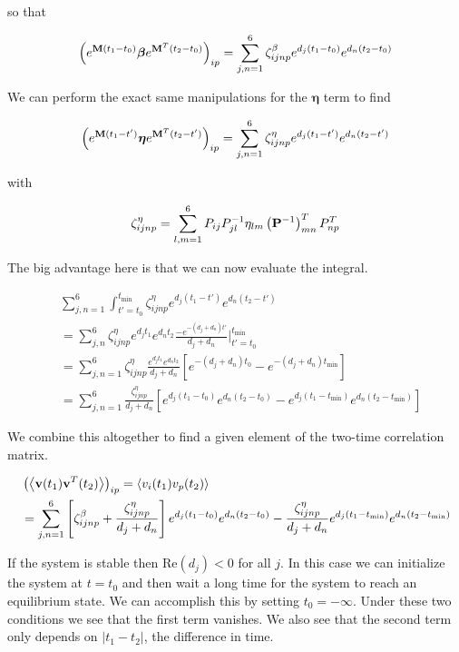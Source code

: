 \documentclass[12pt]{article}
\newcommand{\bv}[1]{\bold{#1}}
\newcommand{\bs}[1]{\boldsymbol{#1}}
\begin{document}
so that

\begin{align}
\left(e^{\bv{M}(t_1-t_0)} \bs{\beta} e^{\bv{M}^T (t_2-t_0)}\right)_{ip} = \sum_{j,n = 1}^6 \zeta_{ijnp}^{\beta} e^{d_j (t_1-t_0)} e^{d_n (t_2-t_0)} 
\end{align}

We can perform the exact same manipulations for the $\bs{\eta}$ term to find

\begin{align}
\left(e^{\bv{M}(t_1-t')} \bs{\eta} e^{\bv{M}^T (t_2-t')}\right)_{ip} = \sum_{j,n = 1}^6 \zeta_{ijnp}^{\eta} e^{d_j(t_1-t')} e^{d_n (t_2-t')} 
\end{align}

with

\begin{align}
\zeta_{ijnp}^{\eta} = \sum_{l,m=1}^6 P_{ij} P^{-1}_{jl} \eta_{lm} \left(\bv{P}^{-1}\right)^T_{mn} P^{T}_{np}
\end{align}

The big advantage here is that we can now evaluate the integral.

\begin{align}
& \sum_{j,n=1}^6 \int_{t'=t_0}^{t_{\text{min}}} \zeta_{ijnp}^{\eta} e^{{d_j}(t_1-t')} e^{d_n (t_2-t')}\\
&=  \sum_{j,n}^6 \zeta_{ijnp}^{\eta} e^{d_j t_1}e^{d_n t_2} \frac{-e^{-(d_j+d_n) t'}}{d_j+d_n}\bigg|_{t'=t_0}^{t_{\text{min}}}\\
&= \sum_{j,n=1}^6 \zeta_{ijnp}^{\eta} \frac{e^{d_j t_1}e^{d_n t_2}}{d_j+d_n}\left[e^{-(d_j+d_n)t_0} - e^{-(d_j+d_n)t_{\text{min}}}\right]\\
&=\sum_{j,n=1}^6 \frac{\zeta_{ijnp}^{\eta}}{d_j+d_n} \left[e^{d_j (t_1-t_0)}e^{d_n (t_2-t_0)} - e^{d_j (t_1-t_{\text{min}})}e^{d_n (t_2-t_{\text{min}})}\right]
\end{align}

We combine this altogether to find a given element of the two-time correlation matrix.

\begin{align}
&\left(\Braket{\bv{v}(t_1)\bv{v}^T(t_2)}\right)_{ip} = \Braket{v_i(t_1)v_p(t_2)} \\
&=\sum_{j,n=1}^6 \left[\zeta_{ijnp}^{\beta} + \frac{\zeta_{ijnp}^{\eta}}{d_j+d_n}\right]e^{d_j (t_1-t_0)}e^{d_n (t_2-t_0)} - \frac{\zeta_{ijnp}^{\eta}}{d_j+d_n} e^{d_j (t_1-t_{\text{min}})}e^{d_n (t_2-t_{\text{min}})}
\end{align}

If the system is stable then $\text{Re}(d_j)<0$ for all $j$. In this case we can initialize the system at $t=t_0$ and then wait a long time for the system to reach an equilibrium state. We can accomplish this by setting $t_0 = -\infty$. Under these two conditions we see that the first term vanishes. We also see that the second term only depends on $|t_1-t_2|$, the difference in time.
\end{document}
